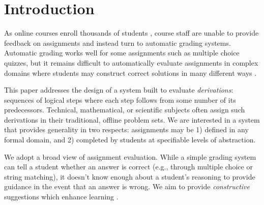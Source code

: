 \documentclass{sigchi}
\begin{document}








 

\section{Introduction}
As online courses enroll thousands of students \cite{enroll}, course staff are unable to provide feedback on assignments and instead turn to automatic grading systems. Automatic grading works well for some assignments such as multiple choice quizzes, but it remains difficult to automatically evaluate assignments in complex domains where students may construct correct solutions in many different ways \cite{automated-scoring-design, automated-grading}. 

This paper addresses the design of a system built to evaluate \textit{derivations}: sequences of logical steps where each step follows from some number of its predecessors. Technical, mathematical, or scientific subjects often assign such derivations in their traditional, offline problem sets. We are interested in a system that provides generality in two respects: assignments may be 1) defined in any formal domain, and 2) completed by students at specifiable levels of abstraction.

We adopt a broad view of assignment evaluation. While a simple grading system can tell a student whether an answer is correct (e.g., through multiple choice or string matching), it doesn't know enough about a student's reasoning to provide guidance in the event that an answer is wrong. We aim to provide \textit{constructive} suggestions which enhance learning \cite{personalized-feedback}.
\end{document}
